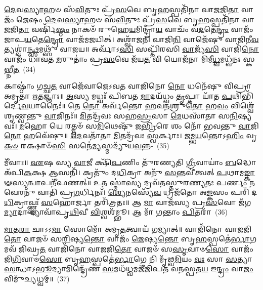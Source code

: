{\anuvakamend[{\-\ul{𑌅}\-𑌫𑍍𑌸𑍁 \ul{𑌨𑍍𑌯}\-𑌙𑍍𑌕𑍗 𑌪𑌞𑍍𑌚᳴𑌦𑌶 𑌚}]}%

\-\ul{𑌦𑍇}\-𑌵\-\ul{𑌸𑍍𑌯𑌾}\-𑌹𑍞 𑌸᳴\-\ul{𑌵𑌿}\-𑌤𑍁𑌃 𑌪𑍍𑌰᳴\-\ul{𑌸}\-𑌵𑍇 𑌬𑍃\-\ul{𑌹}\-𑌸𑍍𑌪𑌤𑌿᳴𑌨𑌾 𑌵𑌾\-\ul{𑌜}\-𑌜𑌿\-\ul{𑌤𑌾} 𑌵𑌾𑌜𑌂᳴ 𑌜𑍇𑌷𑌂 \ul{𑌦𑍇}\-𑌵\-\ul{𑌸𑍍𑌯𑌾}\-𑌹𑍞 𑌸᳴\-\ul{𑌵𑌿}\-𑌤𑍁𑌃 𑌪𑍍𑌰᳴\-\ul{𑌸}\-𑌵𑍇 𑌬𑍃\-\ul{𑌹}\-𑌸𑍍𑌪𑌤𑌿᳴𑌨𑌾 𑌵𑌾\-\ul{𑌜}\-𑌜𑌿\-\ul{𑌤𑌾} 𑌵𑌰𑍍\mbox{}𑌷𑌿᳴\-\ul{𑌷𑍍𑌠𑌂} 𑌨𑌾𑌕𑍞᳴ 𑌰𑍁𑌹𑍇\-\ul{𑌯}\-𑌮𑌿𑌨𑍍𑌦𑍍𑌰𑌾᳴\-\ul{𑌯} 𑌵𑌾𑌚𑌂᳴ 𑌵\-\ul{𑌦}\-𑌤𑍇\-\ul{𑌨𑍍𑌦𑍍𑌰𑌂} 𑌵𑌾𑌜𑌂᳴ 𑌜𑌾𑌪\-\ul{𑌯}\-𑌤𑍇\-\ul{𑌨𑍍𑌦𑍍𑌰𑍋} 𑌵𑌾𑌜᳴𑌮𑌜𑌯𑌿𑌤𑍍। 𑌅𑌶𑍍𑌵𑌾᳴𑌜𑌨𑌿 𑌵𑌾𑌜𑌿\-\ul{𑌨𑌿} 𑌵𑌾𑌜𑍇᳴𑌷𑍁 𑌵𑌾𑌜𑌿𑌨𑍀\-\ul{𑌵}\-𑌤𑍍𑌯𑌶𑍍𑌵𑌾॑\-\ul{𑌨𑍍𑌥𑍍𑌸}\-𑌮𑌥𑍍𑌸𑍁᳴ 𑌵𑌾𑌜𑌯॥ 𑌅𑌰𑍍𑌵𑌾᳴𑌽\-\ul{𑌸𑌿} 𑌸𑌪𑍍𑌤𑌿᳴𑌰𑌸𑌿 \ul{𑌵𑌾}\-𑌜𑍍𑌯᳴\-\ul{𑌸𑌿} 𑌵𑌾𑌜𑌿᳴\-\ul{𑌨𑍋} 𑌵𑌾𑌜𑌂᳴ 𑌧𑌾𑌵𑌤 \ul{𑌮}\-𑌰𑍁𑌤𑌾𑌂॑ 𑌪𑍍𑌰\-\ul{𑌸}\-𑌵𑍇 𑌜᳴𑌯\-\ul{𑌤} 𑌵𑌿 𑌯𑍋𑌜᳴𑌨𑌾 𑌮𑌿𑌮𑍀\-\ul{𑌧𑍍𑌵}\-𑌮𑌧𑍍𑌵᳴𑌨𑌃 𑌸𑍍𑌕𑌭𑍍𑌨𑍀\-\ul{𑌤}\-~(34)

𑌕𑌾𑌷𑍍𑌠𑌾𑌂॑ 𑌗𑌚𑍍𑌛\-\ul{𑌤} 𑌵𑌾𑌜𑍇᳴𑌵𑌾𑌜𑍇\-𑌽𑌵𑌤 𑌵𑌾𑌜𑌿𑌨𑍋 \ul{𑌨𑍋} 𑌧𑌨𑍇᳴𑌷𑍁 𑌵𑌿𑌪𑍍𑌰𑌾 𑌅𑌮𑍃𑌤𑌾 𑌋𑌤𑌜𑍍𑌞𑌾𑌃॥ \ul{𑌅}\-𑌸𑍍𑌯 𑌮𑌧𑍍𑌵𑌃᳴ 𑌪𑌿𑌬𑌤 \ul{𑌮𑌾}\-𑌦𑌯᳴𑌧𑍍𑌵𑌂 \ul{𑌤𑍃}\-𑌪𑍍𑌤𑌾 𑌯𑌾᳴𑌤 \ul{𑌪}\-𑌥𑌿𑌭𑌿᳴𑌰𑍍𑌦𑍇\-\ul{𑌵}\-𑌯𑌾𑌨𑍈𑌃॑॥ 𑌤𑍇 \ul{𑌨𑍋} 𑌅𑌰𑍍𑌵᳴𑌨𑍍𑌤𑍋 𑌹𑌵\-\ul{𑌨}\-𑌶𑍍𑌰𑍁\-\ul{𑌤𑍋} 𑌹\-\ul{𑌵𑌂} 𑌵𑌿𑌶𑍍𑌵𑍇᳴ 𑌶𑍃𑌣𑍍𑌵𑌨𑍍𑌤𑍁 \ul{𑌵𑌾}\-𑌜𑌿𑌨𑌃᳴॥ \ul{𑌮𑌿}\-𑌤𑌦𑍍𑌰᳴𑌵𑌃 𑌸𑌹\-\ul{𑌸𑍍𑌰}\-𑌸𑌾 \ul{𑌮𑍇}\-𑌧𑌸𑌾᳴𑌤𑌾 𑌸\-\ul{𑌨𑌿}\-𑌷𑍍𑌯𑌵𑌃᳴। \ul{𑌮}\-𑌹𑍋 𑌯𑍇 𑌰𑌤𑍍𑌨𑍞᳴ 𑌸\-\ul{𑌮𑌿}\-𑌥𑍇𑌷𑍁᳴ 𑌜\-\ul{𑌭𑍍𑌰𑌿}\-𑌰𑍇 𑌶𑌂 𑌨𑍋᳴ 𑌭𑌵𑌨𑍍𑌤𑍁 \ul{𑌵𑌾}\-𑌜𑌿\-\ul{𑌨𑍋} 𑌹𑌵𑍇᳴𑌷𑍁॥ \ul{𑌦𑍇}\-𑌵𑌤𑌾᳴𑌤𑌾 \ul{𑌮𑌿}\-𑌤𑌦𑍍𑌰᳴𑌵𑌃 \ul{𑌸𑍍𑌵}\-𑌰𑍍𑌕𑌾𑌃। \ul{𑌜}\-𑌮𑍍𑌭\-\ul{𑌯}\-𑌨𑍍𑌤𑍋\-𑌽\-\ul{𑌹𑌿𑌂} 𑌵𑍃\-\ul{𑌕}\-\-\ul{𑍞} 𑌰𑌕𑍍𑌷𑌾𑍞᳴\-\ul{𑌸𑌿} 𑌸𑌨𑍇॑\-\ul{𑌮𑍍𑌯}\-𑌸𑍍𑌮𑌦𑍍𑌯𑍁᳴𑌯\-\ul{𑌵}\-𑌨𑍍𑌨-~(35)

𑌮𑍀᳴𑌵𑌾𑌃॥ \ul{𑌏}\-𑌷 𑌸𑍍𑌯 \ul{𑌵𑌾}\-𑌜𑍀 𑌕𑍍𑌷𑌿᳴\-\ul{𑌪}\-𑌣𑌿𑌂 𑌤𑍁᳴𑌰𑌣𑍍𑌯𑌤𑌿 \ul{𑌗𑍍𑌰𑍀}\-𑌵𑌾𑌯𑌾𑌂॑ \ul{𑌬}\-𑌦𑍍𑌧𑍋 𑌅᳴𑌪𑌿\-\ul{𑌕}\-𑌕𑍍𑌷 \ul{𑌆}\-𑌸𑌨𑌿᳴। 𑌕𑍍𑌰𑌤𑍁𑌂᳴ 𑌦\-\ul{𑌧𑌿}\-𑌕𑍍𑌰𑌾 𑌅𑌨𑍁᳴ \ul{𑌸}\-𑌨𑍍𑌤𑌵𑍀॑𑌤𑍍𑌵𑌤𑍍 \ul{𑌪}\-𑌥𑌾𑌮\-\ul{𑌙𑍍𑌕𑌾}\-\-\ul{𑍟}\-𑌸𑍍𑌯\-\ul{𑌨𑍍𑌵𑌾}\-𑌪𑌨𑍀᳴𑌫𑌣𑌤𑍍॥ \ul{𑌉}\-𑌤 𑌸𑍍𑌮𑌾॑\-\ul{𑌸𑍍𑌯} 𑌦𑍍𑌰𑌵᳴𑌤𑌸𑍍𑌤𑍁𑌰\-\ul{𑌣𑍍𑌯}\-𑌤𑌃 \ul{𑌪}\-𑌰𑍍𑌣𑌂 𑌨 𑌵𑍇𑌰𑌨𑍁᳴ 𑌵𑌾𑌤𑌿 𑌪𑍍𑌰\-\ul{𑌗}\-𑌰𑍍𑌧𑌿𑌨𑌃᳴। \ul{𑌶𑍍𑌯𑍇}\-𑌨𑌸𑍍𑌯𑍇᳴\-\ul{𑌵} 𑌧𑍍𑌰𑌜᳴𑌤𑍋 𑌅\-\ul{𑌙𑍍𑌕}\-𑌸𑌂 𑌪𑌰𑌿᳴ 𑌦\-\ul{𑌧𑌿}\-𑌕𑍍𑌰𑌾𑌵𑍍𑌣𑍍𑌣𑌃᳴ \ul{𑌸}\-𑌹𑍋𑌰𑍍𑌜𑌾 𑌤𑌰𑌿᳴𑌤𑍍𑌰𑌤𑌃॥ 𑌆 \ul{𑌮𑌾} 𑌵𑌾𑌜᳴𑌸𑍍𑌯 𑌪𑍍𑌰\-\ul{𑌸}\-𑌵𑍋 𑌜᳴𑌗\-\ul{𑌮𑍍𑌯𑌾}\-𑌦𑌾 𑌦𑍍𑌯𑌾𑌵𑌾᳴𑌪𑍃\-\ul{𑌥𑌿}\-𑌵𑍀 \ul{𑌵𑌿}\-𑌶𑍍𑌵𑌶᳴𑌮𑍍𑌭𑍂। 𑌆 𑌮𑌾᳴ 𑌗𑌨𑍍𑌤𑌾𑌂 \ul{𑌪𑌿}\-𑌤𑌰𑌾᳴~(36)

\-\ul{𑌮𑌾}\-𑌤\-\ul{𑌰𑌾} 𑌚𑌾\-𑌽\-𑌽\-\ul{𑌮𑌾} 𑌸𑍋𑌮𑍋᳴ 𑌅𑌮𑍃\-\ul{𑌤}\-𑌤𑍍𑌵𑌾𑌯᳴ 𑌗𑌮𑍍𑌯𑌾𑌤𑍍॥ 𑌵𑌾𑌜𑌿᳴𑌨𑍋 𑌵𑌾𑌜𑌜𑌿\-\ul{𑌤𑍋} 𑌵𑌾𑌜𑍞᳴ 𑌸\-\ul{𑌰𑌿}\-𑌷𑍍𑌯\-\ul{𑌨𑍍𑌤𑍋} 𑌵𑌾𑌜𑌂᳴ \ul{𑌜𑍇}\-𑌷𑍍𑌯\-\ul{𑌨𑍍𑌤𑍋} 𑌬𑍃\-\ul{𑌹}\-𑌸𑍍𑌪𑌤𑍇॑\-\ul{𑌰𑍍𑌭𑌾}\-𑌗𑌮𑌵᳴ 𑌜𑌿𑌘𑍍𑌰\-\ul{𑌤} 𑌵𑌾𑌜𑌿᳴𑌨𑍋 𑌵𑌾𑌜𑌜𑌿\-\ul{𑌤𑍋} 𑌵𑌾𑌜𑍞᳴ 𑌸\-\ul{𑌸𑍃}\-𑌵𑌾𑍞\-\ul{𑌸𑍋} 𑌵𑌾𑌜𑌂᳴ 𑌜𑌿\-\ul{𑌗𑌿}\-𑌵𑌾𑍞\-\ul{𑌸𑍋} 𑌬𑍃\-\ul{𑌹}\-𑌸𑍍𑌪𑌤𑍇॑\-\ul{𑌰𑍍𑌭𑌾}\-𑌗𑍇 𑌨𑌿 𑌮𑍃᳴𑌢𑍍𑌵\-\ul{𑌮𑌿}\-𑌯𑌂 \ul{𑌵𑌃} 𑌸𑌾 \ul{𑌸}\-𑌤𑍍𑌯𑌾 \ul{𑌸}\-𑌨𑍍𑌧𑌾\-𑌽\-\ul{𑌭𑍂}\-𑌦𑍍𑌯𑌾𑌮𑌿𑌨𑍍𑌦𑍍𑌰𑍇᳴𑌣 \ul{𑌸}\-𑌮𑌧᳴\-\ul{𑌧𑍍𑌵}\-𑌮𑌜𑍀᳴𑌜𑌿𑌪𑌤 𑌵𑌨𑌸𑍍𑌪𑌤\-\ul{𑌯} 𑌇\-\ul{𑌨𑍍𑌦𑍍𑌰𑌂} 𑌵𑌾\-\ul{𑌜𑌂} 𑌵𑌿𑌮𑍁᳴𑌚𑍍𑌯𑌧𑍍𑌵𑌮𑍍॥~(37)

